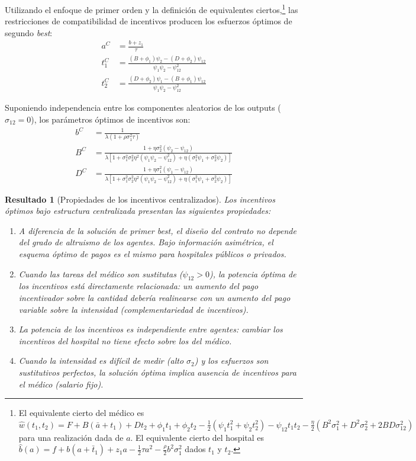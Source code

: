 \documentclass[12pt, a4paper, twoside, openright]{book}
\theoremstyle{plain}
\newtheorem{result}{Resultado}[chapter]
\theoremstyle{definition}
\theoremstyle{remark}
\begin{document}
Utilizando el enfoque de primer orden y la definición de equivalentes ciertos,\footnote{El equivalente cierto del médico es $\widehat{w}(t_1,t_2)=F+B(\bar{a}+t_1)+Dt_2+\phi_1t_1+\phi_2t_2-\frac{1}{2}(\psi_1t_1^2+\psi_2t_2^2)-\psi_{12}t_1t_2-\frac{\eta}{2}(B^2\sigma_1^2+D^2\sigma_2^2+2BD\sigma_{12}^2)$ para una realización dada de $a$. El equivalente cierto del hospital es $\widehat{b}(a)=f+b(a+\bar{t}_1)+z_1a-\frac{1}{2}\tau a^2-\frac{\rho}{2}b^2\sigma_1^2$ dados $t_1$ y $t_2$.} las restricciones de compatibilidad de incentivos producen los esfuerzos óptimos de segundo \textit{best}:
\begin{align}
  a^{C} &= \frac{b+z_1}{\tau} \label{eq:a_sb}\\
  t_1^{C} &= \frac{(B+\phi_1)\psi_2-(D+\phi_2)\psi_{12}}{\psi_1\psi_2-\psi_{12}^2} \label{eq:t1_sb}\\
  t_2^{C} &= \frac{(D+\phi_2)\psi_1-(B+\phi_1)\psi_{12}}{\psi_1\psi_2-\psi_{12}^2} \label{eq:t2_sb}
\end{align}

Suponiendo independencia entre los componentes aleatorios de los outputs ($\sigma_{12}=0$), los parámetros óptimos de incentivos son:
\begin{align}
  b^C &= \frac{1}{\lambda(1+\rho\sigma_1^2\tau)} \label{eq:b_sb}\\
  B^C &= \frac{1+\eta\sigma_2^2(\psi_2-\psi_{12})}{\lambda[1+\sigma_1^2\sigma_2^2\eta^2(\psi_1\psi_2-\psi_{12}^2)+\eta(\sigma_1^2\psi_1+\sigma_2^2\psi_2)]} \label{eq:B_sb}\\
  D^C &= \frac{1+\eta\sigma_1^2(\psi_1-\psi_{12})}{\lambda[1+\sigma_1^2\sigma_2^2\eta^2(\psi_1\psi_2-\psi_{12}^2)+\eta(\sigma_1^2\psi_1+\sigma_2^2\psi_2)]} \label{eq:D_sb}
\end{align}

\begin{result}[Propiedades de los incentivos centralizados]
\label{res:incentivos_centralizados}
Los incentivos óptimos bajo estructura centralizada presentan las siguientes propiedades:
\begin{enumerate}[label=(\alph*)]
  \item A diferencia de la solución de primer \textit{best}, el diseño del contrato no depende del grado de altruismo de los agentes. Bajo información asimétrica, el esquema óptimo de pagos es el mismo para hospitales públicos o privados.
  \item Cuando las tareas del médico son sustitutas ($\psi_{12}>0$), la potencia óptima de los incentivos está directamente relacionada: un aumento del pago incentivador sobre la cantidad debería realinearse con un aumento del pago variable sobre la intensidad (\textit{complementariedad de incentivos}).
  \item La potencia de los incentivos es independiente entre agentes: cambiar los incentivos del hospital no tiene efecto sobre los del médico.
  \item Cuando la intensidad es difícil de medir (alto $\sigma_2$) y los esfuerzos son sustitutivos perfectos, la solución óptima implica ausencia de incentivos para el médico (salario fijo).
\end{enumerate}
\end{result}
\end{document}
